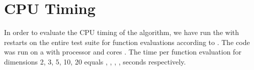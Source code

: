 \documentclass[sigconf]{acmart}
\begin{document}




\maketitle


%
%
%
%
\section{CPU Timing}
In order to evaluate the CPU timing of the algorithm, we have run the \change{\algorithmA} with restarts on the entire \bbob test suite \cite{hansen2009fun} for  function evaluations according to \cite{hansen2016exp}.
 The  code was run on a  with  processor and  cores . The time per function evaluation for dimensions 2, 3, 5, 10, 20 equals , , , ,  seconds respectively. 
\end{document}
